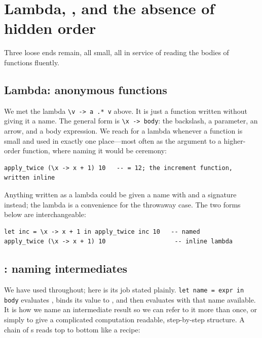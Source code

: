\section{Lambda, , and the absence of hidden order}

Three loose ends remain, all small, all in service of reading the bodies of
functions fluently.

\subsection{Lambda: anonymous functions}

We met the lambda \lstinline[style=l4style]|\v -> a .* v| above. It is just a
function written without giving it a name. The general form is
\lstinline[style=l4style]|\x -> body|: the backslash, a parameter, an arrow, and a
body expression. We reach for a lambda whenever a function is small and used in
exactly one place---most often as the argument to a higher-order function, where
naming it would be ceremony:

\begin{lstlisting}[style=l4style]
apply_twice (\x -> x + 1) 10   -- = 12; the increment function, written inline
\end{lstlisting}

\noindent Anything written as a lambda could be given a name with  and a
signature instead; the lambda is a convenience for the throwaway case. The two
forms below are interchangeable:

\begin{lstlisting}[style=l4style]
let inc = \x -> x + 1 in apply_twice inc 10   -- named
apply_twice (\x -> x + 1) 10                   -- inline lambda
\end{lstlisting}

\subsection{: naming intermediates}

We have used  throughout; here is its job stated plainly.
\lstinline[style=l4style]|let name = expr in body| evaluates ,
binds its value to , and then evaluates  with that name
available. It is how we name an intermediate result so we can refer to it more
than once, or simply to give a complicated computation readable, step-by-step
structure. A chain of s reads top to bottom like a recipe:


